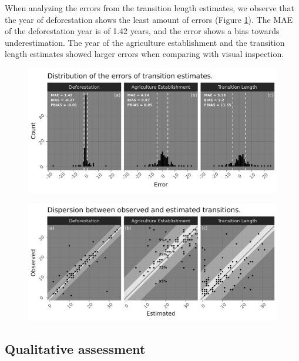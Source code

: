\documentclass[essd, manuscript]{copernicus}
\begin{document}
When analyzing the errors from the transition length estimates, we observe that the year of deforestation shows the least amount of errors (Figure \ref{fig:errorbar-plot}).
The MAE of the deforestation year is of 1.42 years, and the error shows a bias towards underestimation.
The year of the agriculture establishment and the transition length estimates showed larger errors when comparing with visual inspection.

\begin{figure}[ht]
\includegraphics[width=17cm]{figs/error_bars} \caption{ }\label{fig:errorbar-plot}
\end{figure}

\begin{figure}[ht]
\includegraphics[width=17cm]{figs/error_scatter} \caption{ }\label{fig:errorscatter-plot}
\end{figure}

\subsection{Qualitative assessment}

\conclusions[Conclusions]






\end{document}
